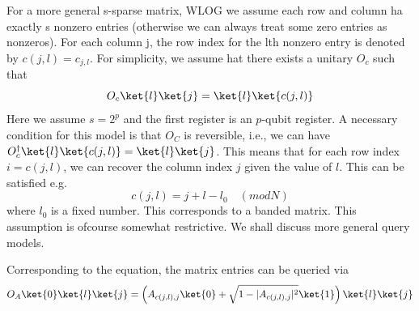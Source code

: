 \documentclass[12pt, oneside]{book}
\theoremstyle{definition}
\theoremstyle{definition}
\theoremstyle{remark}
\begin{document}
For a more general s-sparse matrix, WLOG we assume each row and column ha exactly s nonzero entries (otherwise we can always treat some zero entries as nonzeros). For each column j, the row index for the lth nonzero entry is denoted by $c(j,l)=c_{j,l}$. For simplicity, we assume hat there exists a unitary $O_c$ such that
\[
O_c\ket{l}\ket{j}=\ket{l}\ket{c(j,l)}
\]
Here we assume $s=2^{p}$ and the first register is an $p$-qubit register. A necessary condition for this model is that $O_C$ is reversible, i.e., we can have $O_c^{\dagger}\ket{l}\ket{c(j,l)}=\ket{l}\ket{j}$. This means that for each row index $i=c(j,l)$, we can recover the column index $j$ given the value of $l$. This can be satisfied e.g.
\[
c(j,l)=j+l-l_0 \quad (mod N)
\]
where $l_0$ is a fixed number. This corresponds to a banded matrix. This assumption is ofcourse somewhat restrictive. We shall discuss more general query models.

Corresponding to the equation, the matrix entries can be queried via
\[
O_A\ket{0}\ket{l}\ket{j}=\left(A_{c(j,l),j}\ket{0}+\sqrt{1-|A_{c(j,l),j}|^2}\ket{1}\right) \ket{l}\ket{j}
\]
\end{document}
